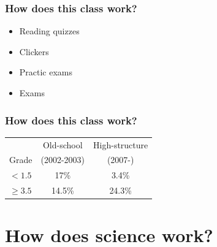 \begin{noheadline}
\begin{frame}[t]
    \frametitle{How does this class work?}

        \vspace{-5mm}
        \begin{itemize}
            \item<1-> Reading quizzes
                \vspace{14mm}
            \item<2-> Clickers
                \vspace{14mm}
            \item<3-> Practic exams
                \vspace{14mm}
            \item<4-> Exams
        \end{itemize}
\end{frame}
\end{noheadline}

\begin{noheadline}
\begin{frame}
    \frametitle{How does this class work?}

    \begin{table}%
        \centering
        \begin{tabular}{ l | c c }
            & Old-school & High-structure \\
            Grade & (2002-2003) & (2007-) \\
            \hline
            $< 1.5$ & 17\% & 3.4\% \\
            $\geq 3.5$ & 14.5\% & 24.3\% \\
        \end{tabular}
    \end{table}

\end{frame}
\end{noheadline}


\section{How does science work?}

